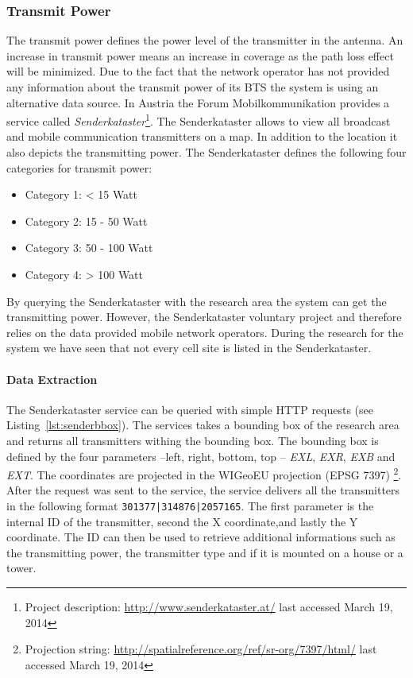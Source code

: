 \subsubsection{Transmit Power}
The transmit power defines the power level of the transmitter in the antenna. An increase in transmit power means an increase in coverage as the path loss effect will be minimized. Due to the fact that the network operator has not provided any information about the transmit power of its BTS the system is using an alternative data source. In Austria the Forum Mobilkommunikation provides a service called \emph{Senderkataster}\footnote{Project description: \url{http://www.senderkataster.at/} last accessed March 19, 2014}. The Senderkataster allows to view all broadcast and mobile communication transmitters on a map. In addition to the location it also depicts the transmitting power. The Senderkataster defines the following four categories for transmit power:
\begin{itemize}
	\item Category 1: < 15 Watt
	\item Category 2: 15 - 50 Watt
	\item Category 3: 50 - 100 Watt
	\item Category 4: > 100 Watt 
\end{itemize}
By querying the Senderkataster with the research area the system can get the transmitting power. However, the Senderkataster voluntary project and therefore relies on the data provided mobile network operators. During the research for the system we have seen that not every cell site is listed in the Senderkataster.
\paragraph{Data Extraction}
The Senderkataster service can be queried with simple HTTP requests (see Listing~\ref{lst:senderbbox}). The services takes a bounding box of the research area and returns all transmitters withing the bounding box. The bounding box is defined by the four parameters --left, right, bottom, top -- \emph{EXL}, \emph{EXR}, \emph{EXB} and \emph{EXT}. The coordinates are projected in the WIGeoEU projection (EPSG 7397) \footnote{Projection string: \url{http://spatialreference.org/ref/sr-org/7397/html/} last accessed March 19, 2014}. After the request was sent to the service, the service delivers all the transmitters in the following format \lstinline+301377|314876|2057165+. The first parameter is the internal ID of the transmitter, second the X coordinate,and lastly the Y coordinate. The ID can then be used to retrieve additional informations such as the transmitting power, the transmitter type and if it is mounted on a house or a tower.

